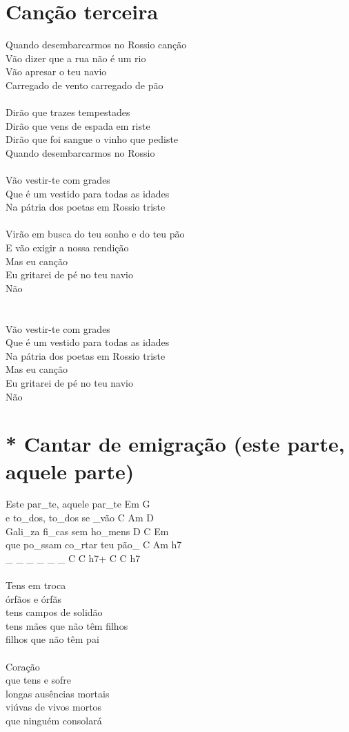 \documentclass{article}
\begin{document}
\section{ Canção terceira}
Quando desembarcarmos no Rossio canção\\
Vão dizer que a rua não é um rio\\
Vão apresar o teu navio \\
Carregado de vento carregado de pão\\
\\
Dirão que trazes tempestades\\
Dirão que vens de espada em riste\\
Dirão que foi sangue o vinho que pediste\\
Quando desembarcarmos no Rossio\\
\\
Vão vestir-te com grades\\
Que é um vestido para todas as idades \\
Na pátria dos poetas em Rossio triste\\
\\
Virão em busca do teu sonho e do teu pão\\
E vão exigir a nossa rendição \\
Mas eu canção\\
Eu gritarei de pé no teu navio\\
Não\\
\\
\\
Vão vestir-te com grades\\
Que é um vestido para todas as idades \\
Na pátria dos poetas em Rossio triste\\
Mas eu canção\\
Eu gritarei de pé no teu navio\\
Não\\
\section{ * Cantar de emigração (este parte, aquele parte)}
Este par_te, aquele par_te     Em G\\
e to_dos, to_dos se _vão       C Am D\\
Gali_za fi_cas sem ho_mens     D C Em\\
que po_ssam co_rtar teu pão_   C Am h7\\
_ _ _ _ _ _                        C C h7+ C C h7\\
\\
Tens em troca\\
órfãos e órfãs\\
tens campos de solidão\\
tens mães que não têm filhos\\
filhos que não têm pai\\
\\
Coração\\
que tens e sofre\\
longas ausências mortais\\
viúvas de vivos mortos\\
que ninguém consolará\\
\end{document}
